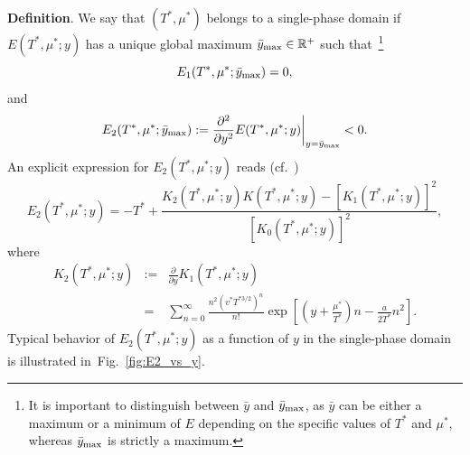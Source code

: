 \documentclass[12pt]{article}
\numberwithin{equation}{section}
\begin{document}
	\textbf{Definition}. We say that $(T^*, \mu^*)$ belongs to a single-phase domain if $E(T^*,\mu^*;y)$ has a unique global maximum $\bar{y}_{\rm max} \in \mathbb{R}^{+}$ such that~\footnote{It is important to distinguish between $\bar{y}$ and $\bar{y}_{\rm max}$, as $\bar{y}$ can be either a maximum or a minimum of $E$ depending on the specific values of $T^*$ and $\mu^*$, whereas $\bar{y}_{\rm max}$ is strictly a maximum.}
	\begin{equation}
		E_1(T^*, \mu^*; \bar{y}_{\rm max}) = 0,
	\end{equation}
	and
	\begin{equation}
		\label{def:E2}
		E_2(T^*, \mu^*;\bar{y}_{\rm max}) := \frac{\partial^2}{\partial y^2} E(T^*,\mu^*;y)\bigg|_{y=\bar{y}_{\rm max}} < 0.
	\end{equation}
	An explicit expression for $E_2(T^*,\mu^*;y)$ reads (cf.~\cite[(20)]{KD22})
	\begin{equation}
		\label{def:reducedE2}
		E_2(T^*,\mu^*;y) = -T^* + \frac{K_2(T^*,\mu^*;y) K(T^*,\mu^*;y) - [K_1(T^*,\mu^*;y)]^2}{[K_0(T^*,\mu^*;y)]^2},
	\end{equation}
	where
	\begin{eqnarray}
		K_2(T^*,\mu^*;y) & := & \frac{\partial}{\partial y} K_1(T^*,\mu^*;y)
		\nonumber\\
		& = & \sum_{n=0}^{\infty} \frac{n^2 (v^* T^{*3/2})^n}{n!} \exp[\left(y+\frac{\mu^*}{T^*}\right)n - \frac{a}{2T^*}n^2].
	\end{eqnarray}
	Typical behavior of $E_2(T^*,\mu^*;y)$ as a function of $y$ in the single-phase domain is illustrated in~Fig.~\ref{fig:E2_vs_y}.
	
\end{document}
